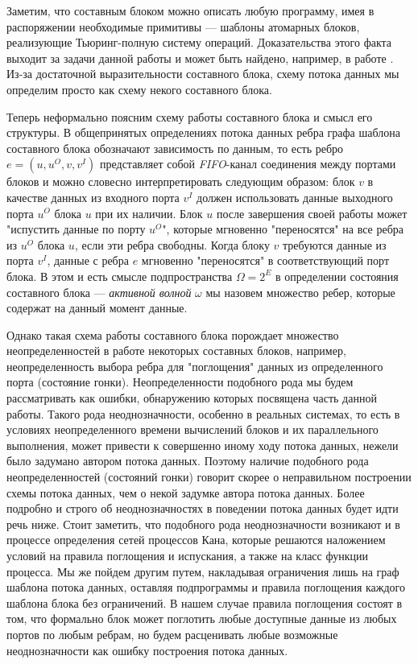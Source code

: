 \documentclass[10pt,a4paper]{article}
\begin{document}
Заметим, что составным блоком можно описать любую программу, имея в распоряжении необходимые примитивы --- шаблоны атомарных блоков,
реализующие Тьюринг-полную систему операций. Доказательства этого факта выходит за задачи данной работы и может быть найдено, например, в работе \cite{workflow-managment}.
Из-за достаточной выразительности составного блока, схему потока данных мы определим просто как схему некого составного блока.

Теперь неформально поясним схему работы составного блока и смысл его структуры.
В общепринятых определениях потока данных ребра графа шаблона составного блока обозначают зависимость по данным, то есть ребро $e = (u, u^O, v, v^I)$ представляет собой
\textit{FIFO}-канал соединения между портами блоков и
можно словесно интерпретировать следующим образом: блок $v$ в качестве данных из входного порта $v^I$ должен использовать данные выходного порта $u^O$ блока $u$ при их наличии.
Блок $u$ после завершения своей работы может "испустить данные по порту $u^O$", которые мгновенно "переносятся" на все ребра из $u^O$ блока $u$,
если эти ребра свободны.
Когда блоку $v$ требуются данные из порта $v^I$, данные с ребра $e$ мгновенно "переносятся" в соответствующий порт блока. В этом и есть смысле подпространства $\Omega = 2^E$
в определении состояния составного блока --- \textit{активной волной} $\omega$ мы назовем множество ребер, которые содержат на данный момент данные.

Однако такая схема работы составного блока порождает множество неопределенностей в работе некоторых составных блоков, например, неопределенность выбора ребра для "поглощения" данных из определенного порта (состояние гонки).
Неопределенности подобного рода мы будем рассматривать как ошибки, обнаружению которых посвящена часть данной работы. Такого рода неоднозначности, особенно в реальных системах,
то есть в условиях неопределенного времени вычислений блоков и их параллельного выполнения, может привести к совершенно иному ходу потока данных, нежели было задумано автором потока данных.
Поэтому наличие подобного рода неопределенностей (состояний гонки) говорит скорее о неправильном построении схемы потока данных, чем о некой задумке автора потока данных.
Более подробно и строго об неоднозначностях в поведении потока данных будет идти речь ниже.
Стоит заметить, что подобного рода неоднозначности возникают и в процессе определения сетей процессов Кана,
которые решаются наложением условий на правила поглощения и испускания, а также на класс функции процесса.
Мы же пойдем другим путем, накладывая ограничения лишь на граф шаблона потока данных, оставляя подпрограммы и правила поглощения каждого шаблона блока без ограничений.
В нашем случае правила поглощения состоят в том, что формально блок может поглотить любые доступные данные из любых портов по любым ребрам,
но будем расценивать любые возможные неоднозначности как ошибку построения потока данных.
\end{document}
